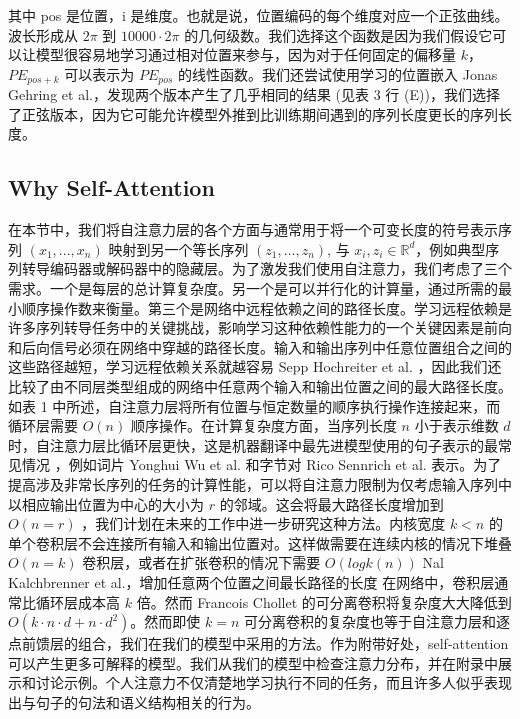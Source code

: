 其中 pos 是位置，i 是维度。也就是说，位置编码的每个维度对应一个正弦曲线。波长形成从 $2\pi$ 到 $10000 \cdot 2 \pi$ 的几何级数。我们选择这个函数是因为我们假设它可以让模型很容易地学习通过相对位置来参与，因为对于任何固定的偏移量 $k$，$PE_{pos+k}$ 可以表示为 $PE_{pos}$ 的线性函数。我们还尝试使用学习的位置嵌入 Jonas Gehring et al.，发现两个版本产生了几乎相同的结果 (见表 3 行 (E))，我们选择了正弦版本，因为它可能允许模型外推到比训练期间遇到的序列长度更长的序列长度。

\subsection{Why Self-Attention}

在本节中，我们将自注意力层的各个方面与通常用于将一个可变长度的符号表示序列 $(x_{1}, ..., x_{n})$ 映射到另一个等长序列 $(z_{1}, ..., z_{n})$, 与 $x_{i}, z_{i} \in \mathbb{R}^{d}$，例如典型序列转导编码器或解码器中的隐藏层。为了激发我们使用自注意力，我们考虑了三个需求。一个是每层的总计算复杂度。另一个是可以并行化的计算量，通过所需的最小顺序操作数来衡量。第三个是网络中远程依赖之间的路径长度。学习远程依赖是许多序列转导任务中的关键挑战，影响学习这种依赖性能力的一个关键因素是前向和后向信号必须在网络中穿越的路径长度。输入和输出序列中任意位置组合之间的这些路径越短，学习远程依赖关系就越容易 Sepp Hochreiter et al. ，因此我们还比较了由不同层类型组成的网络中任意两个输入和输出位置之间的最大路径长度。如表 1 中所述，自注意力层将所有位置与恒定数量的顺序执行操作连接起来，而循环层需要 $O(n)$ 顺序操作。在计算复杂度方面，当序列长度 $n$ 小于表示维数 $d$ 时，自注意力层比循环层更快，这是机器翻译中最先进模型使用的句子表示的最常见情况 ，例如词片 Yonghui Wu et al. 和字节对 Rico Sennrich et al. 表示。为了提高涉及非常长序列的任务的计算性能，可以将自注意力限制为仅考虑输入序列中以相应输出位置为中心的大小为 $r$ 的邻域。这会将最大路径长度增加到 $O(n=r)$ ，我们计划在未来的工作中进一步研究这种方法。内核宽度 $k < n$ 的单个卷积层不会连接所有输入和输出位置对。这样做需要在连续内核的情况下堆叠 $O(n=k)$ 卷积层，或者在扩张卷积的情况下需要 $O(logk(n))$ Nal Kalchbrenner et al.，增加任意两个位置之间最长路径的长度 在网络中，卷积层通常比循环层成本高 $k$ 倍。然而 Francois Chollet 的可分离卷积将复杂度大大降低到 $O\left(k \cdot n \cdot d+n \cdot d^{2}\right)$。然而即使 $k = n$ 可分离卷积的复杂度也等于自注意力层和逐点前馈层的组合，我们在我们的模型中采用的方法。作为附带好处，self-attention 可以产生更多可解释的模型。我们从我们的模型中检查注意力分布，并在附录中展示和讨论示例。个人注意力不仅清楚地学习执行不同的任务，而且许多人似乎表现出与句子的句法和语义结构相关的行为。

